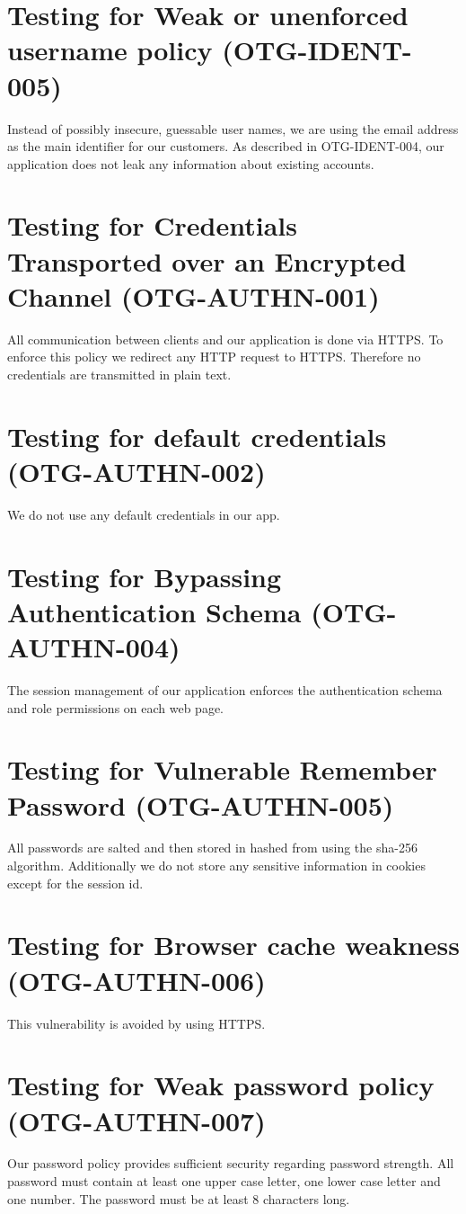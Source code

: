 \section{Testing for Weak or unenforced username policy (OTG-IDENT-005)}
Instead of possibly insecure, guessable user names, we are using the email address as the main identifier for our customers. As described in OTG-IDENT-004, our application does not leak any information about existing accounts.

\section{Testing for Credentials Transported over an Encrypted Channel (OTG-AUTHN-001)}
All communication between clients and our application is done via HTTPS. To enforce this policy we redirect any HTTP request to HTTPS. Therefore no credentials are transmitted in plain text.

\section{Testing for default credentials (OTG-AUTHN-002)}
We do not use any default credentials in our app. 

\section{Testing for Bypassing Authentication Schema (OTG-AUTHN-004)}
The session management of our application enforces the authentication schema and role permissions on each web page.
 
\section{Testing for Vulnerable Remember Password (OTG-AUTHN-005)}
All passwords are salted and then stored in hashed from using the sha-256 algorithm. Additionally we do not store any sensitive information in cookies except for the session id.

\section{Testing for Browser cache weakness (OTG-AUTHN-006)}
This vulnerability is avoided by using HTTPS.

\section{Testing for Weak password policy (OTG-AUTHN-007)}
Our password policy provides sufficient security regarding password strength. All password must contain at least one upper case letter, one lower case letter and one number. The password must be at least 8 characters long.

